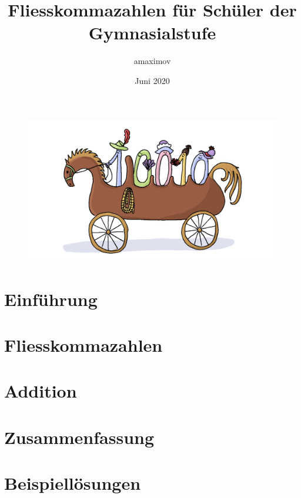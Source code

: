 \documentclass{article}
\title{Fliesskommazahlen für Schüler der Gymnasialstufe}
\author{amaximov}
\date{Juni 2020}
\begin{document}
\maketitle

\begin{figure}[H]
\centering
\includegraphics[width=\linewidth]{Pictures/Kutsche.png} 
\end{figure}

\tableofcontents

\section{Einführung}

\newpage

\section{Fliesskommazahlen}

\newpage

\section{Addition}

\newpage

\section{Zusammenfassung}


\newpage

\nocite{*}


\newpage

\section{Beispiellösungen}

\end{document}
